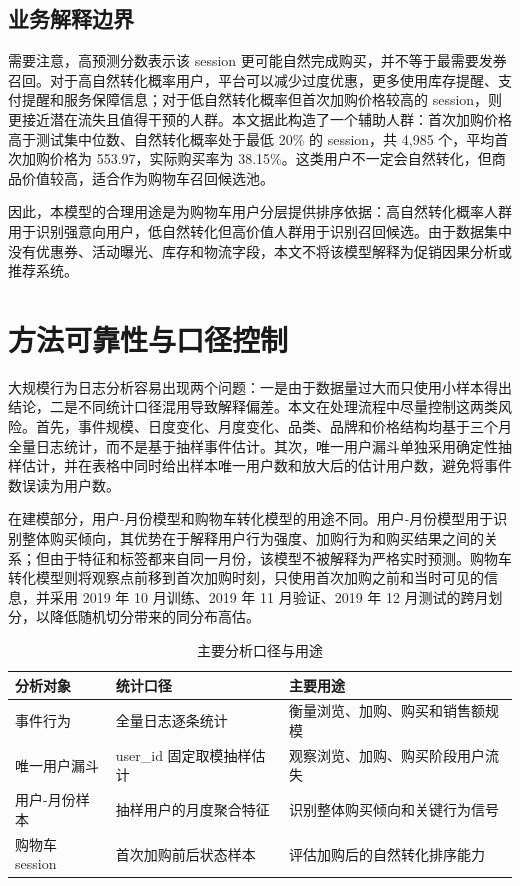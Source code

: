 \documentclass[12pt,hyperref,a4paper,UTF8]{ctexart}
\begin{document}
\subsection{业务解释边界}

需要注意，高预测分数表示该 session 更可能自然完成购买，并不等于最需要发券召回。对于高自然转化概率用户，平台可以减少过度优惠，更多使用库存提醒、支付提醒和服务保障信息；对于低自然转化概率但首次加购价格较高的 session，则更接近潜在流失且值得干预的人群。本文据此构造了一个辅助人群：首次加购价格高于测试集中位数、自然转化概率处于最低 20\% 的 session，共 4,985 个，平均首次加购价格为 553.97，实际购买率为 38.15\%。这类用户不一定会自然转化，但商品价值较高，适合作为购物车召回候选池。

因此，本模型的合理用途是为购物车用户分层提供排序依据：高自然转化概率人群用于识别强意向用户，低自然转化但高价值人群用于识别召回候选。由于数据集中没有优惠券、活动曝光、库存和物流字段，本文不将该模型解释为促销因果分析或推荐系统。

\section{方法可靠性与口径控制}

大规模行为日志分析容易出现两个问题：一是由于数据量过大而只使用小样本得出结论，二是不同统计口径混用导致解释偏差。本文在处理流程中尽量控制这两类风险。首先，事件规模、日度变化、月度变化、品类、品牌和价格结构均基于三个月全量日志统计，而不是基于抽样事件估计。其次，唯一用户漏斗单独采用确定性抽样估计，并在表格中同时给出样本唯一用户数和放大后的估计用户数，避免将事件数误读为用户数。

在建模部分，用户-月份模型和购物车转化模型的用途不同。用户-月份模型用于识别整体购买倾向，其优势在于解释用户行为强度、加购行为和购买结果之间的关系；但由于特征和标签都来自同一月份，该模型不被解释为严格实时预测。购物车转化模型则将观察点前移到首次加购时刻，只使用首次加购之前和当时可见的信息，并采用 2019 年 10 月训练、2019 年 11 月验证、2019 年 12 月测试的跨月划分，以降低随机切分带来的同分布高估。

\begin{table}[H]
\centering
\caption{主要分析口径与用途}
\begin{tabular}{p{}p{}p{}}
\toprule
分析对象 & 统计口径 & 主要用途 \\
\midrule
事件行为 & 全量日志逐条统计 & 衡量浏览、加购、购买和销售额规模 \\
唯一用户漏斗 & user\_id 固定取模抽样估计 & 观察浏览、加购、购买阶段用户流失 \\
用户-月份样本 & 抽样用户的月度聚合特征 & 识别整体购买倾向和关键行为信号 \\
购物车 session & 首次加购前后状态样本 & 评估加购后的自然转化排序能力 \\
\bottomrule
\end{tabular}
\end{table}
\end{document}
